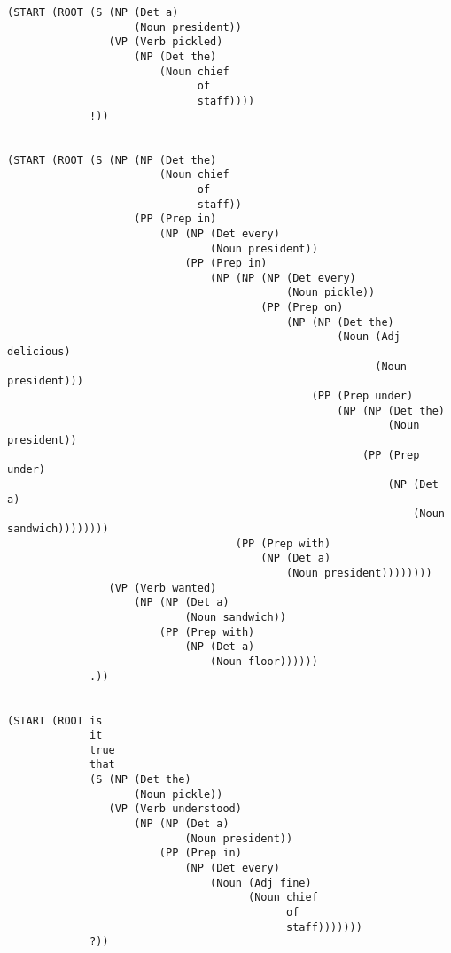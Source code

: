 \documentclass[10pt]{article}
\begin{document}
\begin{enumerate}
{\begin{verbatim}
(START (ROOT (S (NP (Det a)
                    (Noun president))
                (VP (Verb pickled)
                    (NP (Det the)
                        (Noun chief
                              of
                              staff))))
             !))


(START (ROOT (S (NP (NP (Det the)
                        (Noun chief
                              of
                              staff))
                    (PP (Prep in)
                        (NP (NP (Det every)
                                (Noun president))
                            (PP (Prep in)
                                (NP (NP (NP (Det every)
                                            (Noun pickle))
                                        (PP (Prep on)
                                            (NP (NP (Det the)
                                                    (Noun (Adj delicious)
                                                          (Noun president)))
                                                (PP (Prep under)
                                                    (NP (NP (Det the)
                                                            (Noun president))
                                                        (PP (Prep under)
                                                            (NP (Det a)
                                                                (Noun sandwich))))))))
                                    (PP (Prep with)
                                        (NP (Det a)
                                            (Noun president))))))))
                (VP (Verb wanted)
                    (NP (NP (Det a)
                            (Noun sandwich))
                        (PP (Prep with)
                            (NP (Det a)
                                (Noun floor))))))
             .))


(START (ROOT is
             it
             true
             that
             (S (NP (Det the)
                    (Noun pickle))
                (VP (Verb understood)
                    (NP (NP (Det a)
                            (Noun president))
                        (PP (Prep in)
                            (NP (Det every)
                                (Noun (Adj fine)
                                      (Noun chief
                                            of
                                            staff)))))))
             ?))


\end{verbatim}
}


\end{enumerate}
\end{document}
